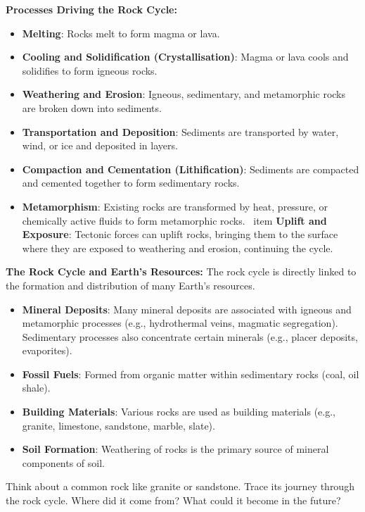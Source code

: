 \textbf{Processes Driving the Rock Cycle:}

\begin{itemize}
    \item \textbf{Melting}: Rocks melt to form magma or lava.
    \item \textbf{Cooling and Solidification (Crystallisation)}: Magma or lava cools and solidifies to form igneous rocks.
    \item \textbf{Weathering and Erosion}: Igneous, sedimentary, and metamorphic rocks are broken down into sediments.
    \item \textbf{Transportation and Deposition}: Sediments are transported by water, wind, or ice and deposited in layers.
    \item \textbf{Compaction and Cementation (Lithification)}: Sediments are compacted and cemented together to form sedimentary rocks.
    \item \textbf{Metamorphism}: Existing rocks are transformed by heat, pressure, or chemically active fluids to form metamorphic rocks.
\    item \textbf{Uplift and Exposure}:  Tectonic forces can uplift rocks, bringing them to the surface where they are exposed to weathering and erosion, continuing the cycle.
\end{itemize}

\textbf{The Rock Cycle and Earth's Resources:}  The rock cycle is directly linked to the formation and distribution of many Earth's resources.

\begin{itemize}
    \item \textbf{Mineral Deposits}:  Many mineral deposits are associated with igneous and metamorphic processes (e.g., hydrothermal veins, magmatic segregation). Sedimentary processes also concentrate certain minerals (e.g., placer deposits, evaporites).
    \item \textbf{Fossil Fuels}:  Formed from organic matter within sedimentary rocks (coal, oil shale).
    \item \textbf{Building Materials}:  Various rocks are used as building materials (e.g., granite, limestone, sandstone, marble, slate).
    \item \textbf{Soil Formation}:  Weathering of rocks is the primary source of mineral components of soil.
\end{itemize}

\begin{stopandthink}
Think about a common rock like granite or sandstone.  Trace its journey through the rock cycle.  Where did it come from?  What could it become in the future?
\end{stopandthink}

